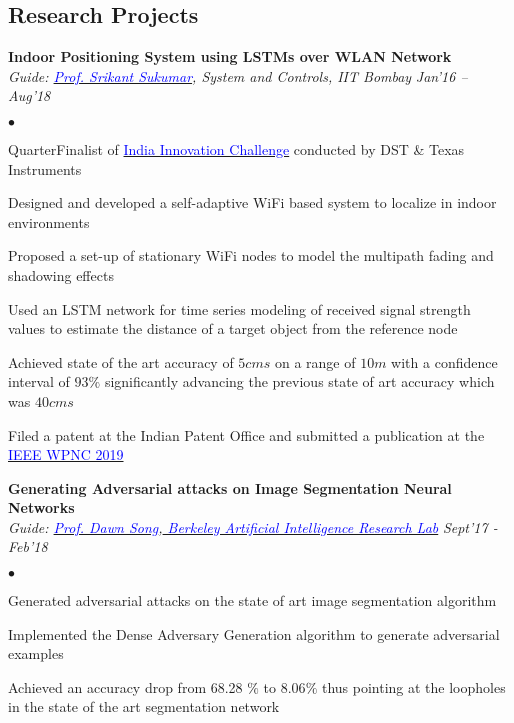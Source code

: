 \documentclass[margin,line, 9pt]{res}
\newenvironment{list2}{
  \begin{list}{$\bullet$}{%
      \setlength{\itemsep}{0.03in}
      \setlength{\parsep}{0in} \setlength{\parskip}{0in}
      \setlength{\topsep}{0in} \setlength{\partopsep}{0in} 
      \setlength{\leftmargin}{0.2in}}}{\end{list}}
\begin{document}
\begin{resume}
\section{\sc Research Projects}
{\bf Indoor Positioning System using LSTMs over WLAN Network} \\
{\em Guide: \href{http://www.sc.iitb.ac.in/~srikant/dokuwiki/doku.php}{\textcolor{blue}{Prof. Srikant Sukumar}}, System and Controls, IIT Bombay} \hfill{\it Jan'16 -- Aug'18} \\
\vspace*{-.13in}
\begin{list2}
\item QuarterFinalist of \href{https://innovate.mygov.in/india-innovation-challenge-design-contest-2018/}{\textcolor{blue} {India Innovation Challenge}} conducted by DST \& Texas Instruments
\item Designed and developed a self-adaptive WiFi based system to localize in indoor environments
\item Proposed a set-up of stationary WiFi nodes to model the multipath fading and shadowing effects
\item Used an LSTM network for time series modeling of received signal strength values to estimate the distance
of a target object from the reference node
\item Achieved state of the art accuracy of $5 cms$ on a range of $10 m$ with a confidence interval of $93\%$ significantly advancing the previous state of art accuracy which was $40 cms$
\item Filed a patent at the Indian Patent Office and submitted a publication at the  \href{https://wpnc.info}{\textcolor{blue}{IEEE WPNC 2019}}

\end{list2}

{\bf Generating Adversarial attacks on Image Segmentation Neural Networks} \\
{\em Guide: \href{https://people.eecs.berkeley.edu/~dawnsong/}{\textcolor{blue}{Prof. Dawn Song}},\href{https://bair.berkeley.edu}{\textcolor{blue}{ Berkeley Artificial Intelligence Research Lab}}} \hfill {\it Sept'17 - Feb'18}\\
\vspace*{-.13in}
\begin{list2}
\item Generated adversarial attacks on the state of art image segmentation algorithm
\item Implemented the Dense Adversary Generation algorithm to generate adversarial examples
\item Achieved an accuracy drop from 68.28 $\%$ to 8.06$\%$ thus pointing at the loopholes in the state of the art segmentation network
\end{list2}


\end{resume}
\end{document}
